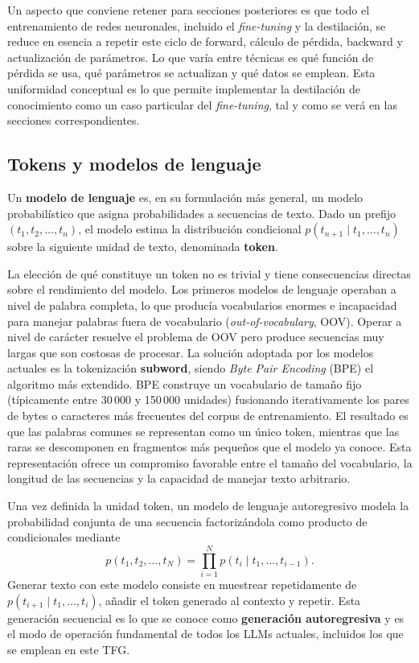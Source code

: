 \documentclass[11pt,a4paper]{article}
\begin{document}
Un aspecto que conviene retener para secciones posteriores es que todo el entrenamiento de redes neuronales, incluido el \textit{fine-tuning} y la destilación, se reduce en esencia a repetir este ciclo de forward, cálculo de pérdida, backward y actualización de parámetros. Lo que varía entre técnicas es qué función de pérdida se usa, qué parámetros se actualizan y qué datos se emplean. Esta uniformidad conceptual es lo que permite implementar la destilación de conocimiento como un caso particular del \textit{fine-tuning}, tal y como se verá en las secciones correspondientes.

\subsection{Tokens y modelos de lenguaje}

Un \textbf{modelo de lenguaje} es, en su formulación más general, un modelo probabilístico que asigna probabilidades a secuencias de texto. Dado un prefijo $(t_1, t_2, \dots, t_n)$, el modelo estima la distribución condicional $p(t_{n+1} \mid t_1, \dots, t_n)$ sobre la siguiente unidad de texto, denominada \textbf{token}.

La elección de qué constituye un token no es trivial y tiene consecuencias directas sobre el rendimiento del modelo. Los primeros modelos de lenguaje operaban a nivel de palabra completa, lo que producía vocabularios enormes e incapacidad para manejar palabras fuera de vocabulario (\textit{out-of-vocabulary}, OOV). Operar a nivel de carácter resuelve el problema de OOV pero produce secuencias muy largas que son costosas de procesar. La solución adoptada por los modelos actuales es la tokenización \textbf{subword}, siendo \textit{Byte Pair Encoding} (BPE) el algoritmo más extendido. BPE construye un vocabulario de tamaño fijo (típicamente entre 30\,000 y 150\,000 unidades) fusionando iterativamente los pares de bytes o caracteres más frecuentes del corpus de entrenamiento. El resultado es que las palabras comunes se representan como un único token, mientras que las raras se descomponen en fragmentos más pequeños que el modelo ya conoce. Esta representación ofrece un compromiso favorable entre el tamaño del vocabulario, la longitud de las secuencias y la capacidad de manejar texto arbitrario.

Una vez definida la unidad token, un modelo de lenguaje autoregresivo modela la probabilidad conjunta de una secuencia factorizándola como producto de condicionales mediante
\[
p(t_1, t_2, \dots, t_N) = \prod_{i=1}^{N} p(t_i \mid t_1, \dots, t_{i-1}).
\]
Generar texto con este modelo consiste en muestrear repetidamente de $p(t_{i+1} \mid t_1, \dots, t_i)$, añadir el token generado al contexto y repetir. Esta generación secuencial es lo que se conoce como \textbf{generación autoregresiva} y es el modo de operación fundamental de todos los LLMs actuales, incluidos los que se emplean en este TFG.
\end{document}
